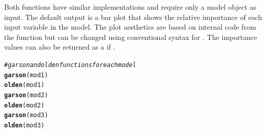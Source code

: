 \documentclass[article,shortnames]{jss}\usepackage[]{graphicx}\usepackage[]{color}
\makeatletter
\newcommand{\hlcom}[1]{\textcolor[rgb]{0.678,0.584,0.686}{\textit{#1}}}%
\newcommand{\hlstd}[1]{\textcolor[rgb]{0.345,0.345,0.345}{#1}}%
\newcommand{\hlkwd}[1]{\textcolor[rgb]{0.737,0.353,0.396}{\textbf{#1}}}%
\newenvironment{kframe}{%
 \def\at@end@of@kframe{}%
 \ifinner\ifhmode%
  \def\at@end@of@kframe{\end{minipage}}%
  \begin{minipage}{\columnwidth}%
 \fi\fi%
 \def\FrameCommand##1{\hskip\@totalleftmargin \hskip-\fboxsep
 \colorbox{shadecolor}{##1}\hskip-\fboxsep
     \hskip-\linewidth \hskip-\@totalleftmargin \hskip\columnwidth}%
 \MakeFramed {\advance\hsize-\width
   \@totalleftmargin\z@ \linewidth\hsize
   \@setminipage}}%
 {\par\unskip\endMakeFramed%
 \at@end@of@kframe}
\makeatother
\begin{document}
Both functions have similar implementations and require only a model object as input.  The default output is a  bar plot \citep[i.e., ,][]{Wickham09} that shows the relative importance of each input variable in the model.  The plot aesthetics are based on internal code from the function but can be changed using conventional syntax for .  The importance values can also be returned as a  if .  

\begin{kframe}
\begin{alltt}
\hlcom{# garson and olden functions for each model}
\hlkwd{garson}\hlstd{(mod1)}
\hlkwd{olden}\hlstd{(mod1)}
\hlkwd{garson}\hlstd{(mod2)}
\hlkwd{olden}\hlstd{(mod2)}
\hlkwd{garson}\hlstd{(mod3)}
\hlkwd{olden}\hlstd{(mod3)}
\end{alltt}
\end{kframe}\begin{figure}[!ht]


\end{figure}
\end{document}
